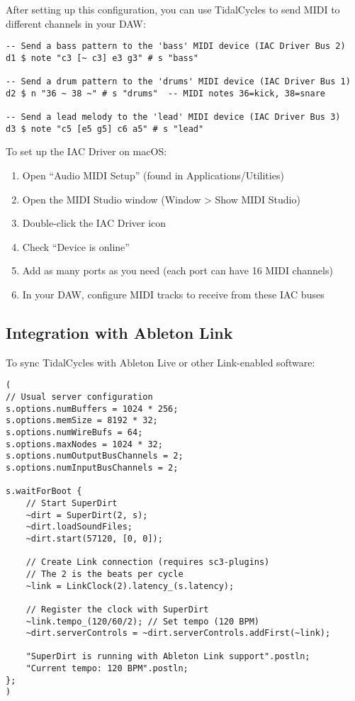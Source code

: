 \documentclass[11pt,a4paper]{article}
\begin{document}
After setting up this configuration, you can use TidalCycles to send MIDI to different channels in your DAW:

\begin{lstlisting}[style=haskell]
-- Send a bass pattern to the 'bass' MIDI device (IAC Driver Bus 2)
d1 $ note "c3 [~ c3] e3 g3" # s "bass"

-- Send a drum pattern to the 'drums' MIDI device (IAC Driver Bus 1)
d2 $ n "36 ~ 38 ~" # s "drums"  -- MIDI notes 36=kick, 38=snare

-- Send a lead melody to the 'lead' MIDI device (IAC Driver Bus 3)
d3 $ note "c5 [e5 g5] c6 a5" # s "lead"
\end{lstlisting}

To set up the IAC Driver on macOS:
\begin{enumerate}
    \item Open ``Audio MIDI Setup'' (found in Applications/Utilities)
    \item Open the MIDI Studio window (Window > Show MIDI Studio) 
    \item Double-click the IAC Driver icon
    \item Check ``Device is online''
    \item Add as many ports as you need (each port can have 16 MIDI channels)
    \item In your DAW, configure MIDI tracks to receive from these IAC buses
\end{enumerate}

\subsection{Integration with Ableton Link}

To sync TidalCycles with Ableton Live or other Link-enabled software:

\begin{lstlisting}[style=supercollider]
(
// Usual server configuration
s.options.numBuffers = 1024 * 256;
s.options.memSize = 8192 * 32;
s.options.numWireBufs = 64;
s.options.maxNodes = 1024 * 32;
s.options.numOutputBusChannels = 2;
s.options.numInputBusChannels = 2;

s.waitForBoot {
    // Start SuperDirt
    ~dirt = SuperDirt(2, s);
    ~dirt.loadSoundFiles;
    ~dirt.start(57120, [0, 0]);
    
    // Create Link connection (requires sc3-plugins)
    // The 2 is the beats per cycle
    ~link = LinkClock(2).latency_(s.latency);
    
    // Register the clock with SuperDirt
    ~link.tempo_(120/60/2); // Set tempo (120 BPM)
    ~dirt.serverControls = ~dirt.serverControls.addFirst(~link);
    
    "SuperDirt is running with Ableton Link support".postln;
    "Current tempo: 120 BPM".postln;
};
)
\end{lstlisting}
\end{document}
